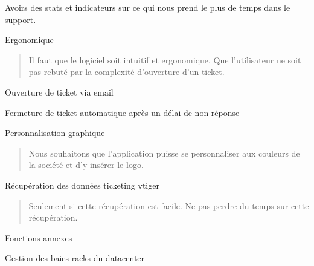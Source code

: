 Avoirs des stats et indicateurs sur ce qui nous prend le plus de temps
dans le support.

Ergonomique

\begin{quote}
Il faut que le logiciel soit intuitif et ergonomique. Que l'utilisateur
ne soit pas rebuté par la complexité d'ouverture d'un ticket.
\end{quote}

Ouverture de ticket via email

Fermeture de ticket automatique après un délai de non-réponse

Personnalisation graphique

\begin{quote}
Nous souhaitons que l'application puisse se personnaliser aux couleurs
de la société et d'y insérer le logo.
\end{quote}

Récupération des données ticketing vtiger

\begin{quote}
Seulement si cette récupération est facile. Ne pas perdre du temps sur
cette récupération.
\end{quote}

Fonctions annexes

Gestion des baies racks du datacenter
